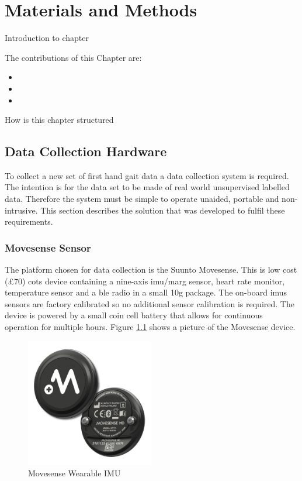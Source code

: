 \chapter{Materials and Methods}
\label{chp:methods}

Introduction to chapter

The contributions of this Chapter are:
\begin{itemize}
    \item 
    \item 
    \item 
\end{itemize}

How is this chapter structured

\section{Data Collection Hardware}
To collect a new set of first hand gait data a data collection system is required. The intention is for the data set to be made of real world unsupervised labelled data. Therefore the system must be simple to operate unaided, portable and non-intrusive. This section describes the solution that was developed to fulfil these requirements.

\subsection{Movesense Sensor}
The platform chosen for data collection is the Suunto Movesense. This is low cost (£70) \acrfull{cots} device containing a nine-axis \acrshort{imu}/\acrshort{marg} sensor, heart rate monitor, temperature sensor and a \acrfull{ble} radio in a small 10g package. The on-board \acrshort{imu}s sensors are factory calibrated so no additional sensor calibration is required. The device is powered by a small coin cell battery that allows for continuous operation for multiple hours. Figure \ref{fig:methods-movesense-sensor} shows a picture of the Movesense device.

\begin{figure}[!hbt]
    \centering
    \includegraphics[width=0.5\textwidth]{content/3-Methods/Movesense-MD-front-and-back.png}
    \caption[Movesense Wearable IMU]{Movesense Wearable IMU} %
    \label{fig:methods-movesense-sensor}
\end{figure}

